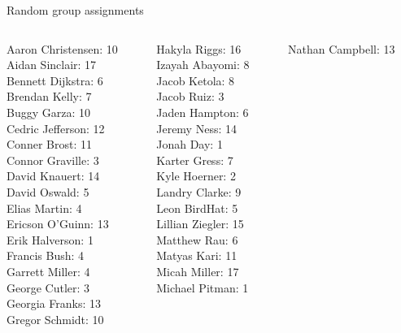 \documentclass[10pt]{beamer}
\begin{document}
\begin{frame}{Random group assignments}
\footnotesize 
\begin{columns}
\begin{column}{0.33\textwidth}
Aaron Christensen: 10 \\ 
Aidan Sinclair: 17 \\ 
Bennett Dijkstra: 6 \\ 
Brendan Kelly: 7 \\ 
Buggy Garza: 10 \\ 
Cedric Jefferson: 12 \\ 
Conner Brost: 11 \\ 
Connor Graville: 3 \\ 
David Knauert: 14 \\ 
David Oswald: 5 \\ 
Elias Martin: 4 \\ 
Ericson O'Guinn: 13 \\ 
Erik Halverson: 1 \\ 
Francis Bush: 4 \\ 
Garrett Miller: 4 \\ 
George Cutler: 3 \\ 
Georgia Franks: 13 \\ 
Gregor Schmidt: 10 \\\end{column}
\begin{column}{0.33\textwidth}
Hakyla Riggs: 16 \\ 
Izayah Abayomi: 8 \\ 
Jacob Ketola: 8 \\ 
Jacob Ruiz: 3 \\ 
Jaden Hampton: 6 \\ 
Jeremy Ness: 14 \\ 
Jonah Day: 1 \\ 
Karter Gress: 7 \\ 
Kyle Hoerner: 2 \\ 
Landry Clarke: 9 \\ 
Leon BirdHat: 5 \\ 
Lillian Ziegler: 15 \\ 
Matthew Rau: 6 \\ 
Matyas Kari: 11 \\ 
Micah Miller: 17 \\ 
Michael Pitman: 1 \\\end{column}
\begin{column}{0.33\textwidth}
Nathan Campbell: 13 \\ 

\end{column}
\end{columns}
\end{frame}
\end{document}
